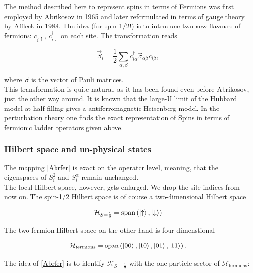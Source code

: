 \documentclass[../../../main.tex]{subfiles}
\begin{document}
The method described here to represent spins in terms of Fermions was first employed by Abrikosov in 1965 and later reformulated in terms of gauge theory by Affleck in 1988. The idea (for spin 1/2!) is to introduce two new flavours of fermions: $c_{i\uparrow}^\dagger, \, c_{i\downarrow}^\dagger$ on each site. The transformation reads

\begin{equation}\label{Abrfer}
\vec{S}_i = \frac12 \sum_{\alpha, \beta} c_{i\alpha}^\dagger \vec{\sigma}_{\alpha \beta} c_{i\beta},
\end{equation}

where $\vec{\sigma}$ is the vector of Pauli matrices. \\

This transformation is quite natural, as it has been found even before Abrikosov, just the other way around. It is known that the large-U limit of the Hubbard model at half-filling gives a antiferromagnetic Heisenberg model. In the perturbation theory one finds the exact representation of Spins in terms of fermionic ladder operators given above.

\subsubsection{Hilbert space and un-physical states}

The mapping \ref{Abrfer} is exact on the operator level, meaning, that the eigenspaces of $S_i^2$ and $S_i^\alpha$ remain unchanged. \\ 

The local Hilbert space, however, gets enlarged. We drop the site-indices from now on. The spin-1/2 Hilbert space is of course a two-dimensional Hilbert space

\begin{equation}
\mathcal{H}_{S=\frac12} =  \text{span}\left(\ket{\uparrow}, \ket{\downarrow} \right)
\end{equation}

The two-fermion Hilbert space on the other hand is four-dimenstional

\begin{equation}
	\mathcal{H}_{\text{fermions}} = \text{span}\left(\ket{00}, \ket{10}, \ket{01}, \ket{11}\right).
\end{equation}

The idea of \ref{Abrfer} is to identify $\mathcal{H}_{S=\frac12}$ with the one-particle sector of $\mathcal{H}_{\text{fermions}}$:
\end{document}
